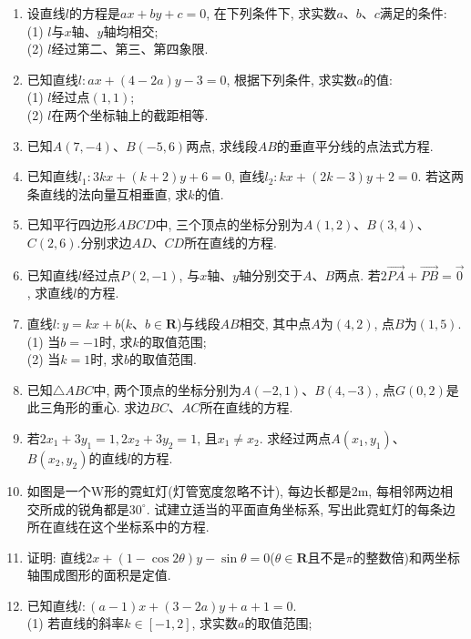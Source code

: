 \documentclass[10pt,a4paper]{article}
\begin{document}
\begin{enumerate}[1.]
\item 设直线$l$的方程是$ax+by+c=0$, 在下列条件下, 求实数$a$、$b$、$c$满足的条件:\\
(1) $l$与$x$轴、$y$轴均相交;\\
(2) $l$经过第二、第三、第四象限.
\item 已知直线$l: ax+(4-2a)y-3=0$, 根据下列条件, 求实数$a$的值:\\
(1) $l$经过点$(1, 1)$;\\
(2) $l$在两个坐标轴上的截距相等.
\item 已知$A(7, -4)$、$B(-5, 6)$两点, 求线段$AB$的垂直平分线的点法式方程.
\item 已知直线$l_1: 3kx+(k+2)y+6=0$, 直线$l_2: kx+(2k-3)y+2=0$. 若这两条直线的法向量互相垂直, 求$k$的值.
\item 已知平行四边形$ABCD$中, 三个顶点的坐标分别为$A(1, 2)$、$B(3, 4)$、$C(2, 6)$.分别求边$AD$、$CD$所在直线的方程.
\item 已知直线$l$经过点$P(2, -1)$, 与$x$轴、$y$轴分别交于$A$、$B$两点. 若$2\overrightarrow{PA}+\overrightarrow{PB}=\overrightarrow 0$, 求直线$l$的方程.
\item 直线$l: y=kx+b$($k$、$b\in \mathbf{R}$)与线段$AB$相交, 其中点$A$为$(4, 2)$, 点$B$为$(1, 5)$.\\
(1) 当$b=-1$时, 求$k$的取值范围;\\
(2) 当$k=1$时, 求$b$的取值范围.
\item 已知$\triangle ABC$中, 两个顶点的坐标分别为$A(-2, 1)$、$B(4, -3)$, 点$G(0, 2)$是此三角形的重心. 求边$BC$、$AC$所在直线的方程.
\item 若$2x_1+3y_1=1, 2x_2+3y_2=1$, 且$x_1\ne x_2$. 求经过两点$A(x_1, y_1)$、$B(x_2, y_2)$的直线$l$的方程.
\item 如图是一个$\text{W}$形的霓虹灯(灯管宽度忽略不计), 每边长都是$2\text{m}$, 每相邻两边相交所成的锐角都是$30^\circ$. 试建立适当的平面直角坐标系, 写出此霓虹灯的每条边所在直线在这个坐标系中的方程.
\begin{center}
\end{center}
\item 证明: 直线$2x+(1-\cos 2\theta)y-\sin \theta =0$($\theta \in \mathbf{R}$且不是$\pi$的整数倍)和两坐标轴围成图形的面积是定值.
\item 已知直线$l: (a-1)x+(3-2a)y+a+1=0$.\\
(1) 若直线的斜率$k\in [-1, 2]$, 求实数$a$的取值范围;\\

\end{enumerate}
\end{document}
